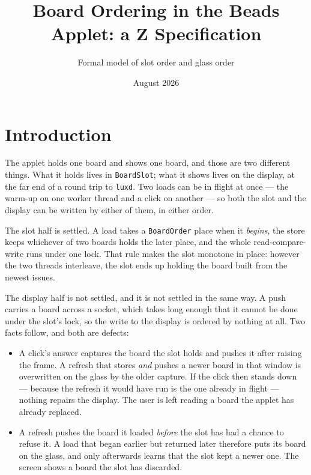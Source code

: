 \documentclass[a4paper,10pt,fleqn]{article}
\begin{document}
\title{Board Ordering in the Beads Applet: a Z Specification}
\author{Formal model of slot order and glass order}
\date{August 2026}
\maketitle

\section{Introduction}

The applet holds one board and shows one board, and those are two different
things. What it holds lives in \texttt{BoardSlot}; what it shows lives on the
display, at the far end of a round trip to \texttt{luxd}. Two loads can be in
flight at once --- the warm-up on one worker thread and a click on another ---
so both the slot and the display can be written by either of them, in either
order.

The slot half is settled. A load takes a \texttt{BoardOrder} place when it
\emph{begins}, the store keeps whichever of two boards holds the later place,
and the whole read-compare-write runs under one lock. That rule makes the slot
monotone in place: however the two threads interleave, the slot ends up holding
the board built from the newest issues.

The display half is not settled, and it is not settled in the same way. A push
carries a board across a socket, which takes long enough that it cannot be done
under the slot's lock, so the write to the display is ordered by nothing at all.
Two facts follow, and both are defects:

\begin{itemize}
  \item A click's answer captures the board the slot holds and pushes it after
    raising the frame. A refresh that stores \emph{and} pushes a newer board in
    that window is overwritten on the glass by the older capture. If the click
    then stands down --- because the refresh it would have run is the one
    already in flight --- nothing repairs the display. The user is left reading
    a board the applet has already replaced.
  \item A refresh pushes the board it loaded \emph{before} the slot has had a
    chance to refuse it. A load that began earlier but returned later therefore
    puts its board on the glass, and only afterwards learns that the slot kept a
    newer one. The screen shows a board the slot has discarded.
\end{itemize}
\end{document}
